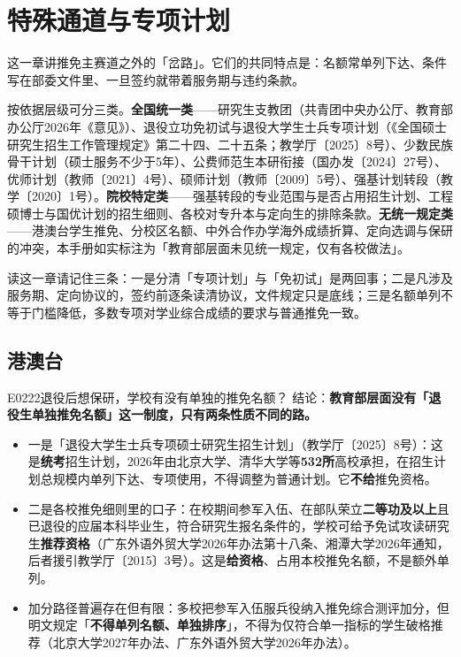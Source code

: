 \chapter{特殊通道与专项计划}
\label{ch13}
\begin{keybox}
这一章讲推免主赛道之外的「岔路」。它们的共同特点是：名额常单列下达、条件写在部委文件里、一旦签约就带着服务期与违约条款。

按依据层级可分三类。\textbf{全国统一类}——研究生支教团（共青团中央办公厅、教育部办公厅2026年《意见》）、退役立功免初试与退役大学生士兵专项计划（《全国硕士研究生招生工作管理规定》第二十四、二十五条；教学厅〔2025〕8号）、少数民族骨干计划（硕士服务不少于5年）、公费师范生本研衔接（国办发〔2024〕27号）、优师计划（教师〔2021〕4号）、硕师计划（教师〔2009〕5号）、强基计划转段（教学〔2020〕1号）。\textbf{院校特定类}——强基转段的专业范围与是否占用招生计划、工程硕博士与国优计划的招生细则、各校对专升本与定向生的排除条款。\textbf{无统一规定类}——港澳台学生推免、分校区名额、中外合作办学海外成绩折算、定向选调与保研的冲突，本手册如实标注为「教育部层面未见统一规定，仅有各校做法」。

读这一章请记住三条：一是分清「专项计划」与「免初试」是两回事；二是凡涉及服务期、定向协议的，签约前逐条读清协议，文件规定只是底线；三是名额单列不等于门槛降低，多数专项对学业综合成绩的要求与普通推免一致。
\end{keybox}

\section{港澳台}
\begin{qa}{E0222}{退役后想保研，学校有没有单独的推免名额？}
结论：\textbf{教育部层面没有「退役生单独推免名额」这一制度，只有两条性质不同的路。}
\begin{itemize}
  \item 一是「退役大学生士兵专项硕士研究生招生计划」（教学厅〔2025〕8号）：这是\textbf{统考}招生计划，2026年由北京大学、清华大学等\textbf{532所}高校承担，在招生计划总规模内单列下达、专项使用，不得调整为普通计划。它\textbf{不给}推免资格。
  \item 二是各校推免细则里的口子：在校期间参军入伍、在部队荣立\textbf{二等功及以上}且已退役的应届本科毕业生，符合研究生报名条件的，学校可给予免试攻读研究生\textbf{推荐资格}（广东外语外贸大学2026年办法第十八条、湘潭大学2026年通知，后者援引教学厅〔2015〕3号）。这是\textbf{给资格}、占用本校推免名额，不是额外单列。
  \item 加分路径普遍存在但有限：多校把参军入伍服兵役纳入推免综合测评加分，但明文规定「\textbf{不得单列名额、单独排序}」，不得为仅符合单一指标的学生破格推荐（北京大学2027年办法、广东外语外贸大学2026年办法）。
\end{itemize}
\end{qa}

